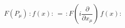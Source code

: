 \begin{equation}\label{40}
 F(P_\mu) \, :f(x):\, = \, :F\left(i\frac{\partial}{\partial x_\mu}\right)\, f(x):
\end{equation}

